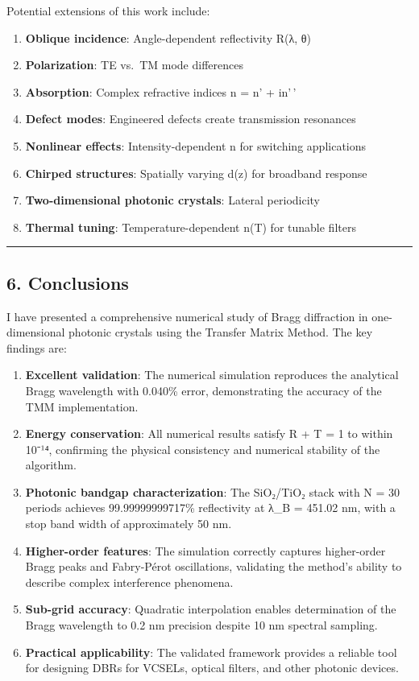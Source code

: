 \documentclass[
]{article}
\providecommand{\tightlist}{%
  \setlength{\itemsep}{0pt}\setlength{\parskip}{0pt}}
\begin{document}
Potential extensions of this work include:

\begin{enumerate}
\def\labelenumi{\arabic{enumi}.}
\tightlist
\item
  \textbf{Oblique incidence}: Angle-dependent reflectivity R(λ, θ)
\item
  \textbf{Polarization}: TE vs.~TM mode differences
\item
  \textbf{Absorption}: Complex refractive indices n = n' + in'\,'
\item
  \textbf{Defect modes}: Engineered defects create transmission
  resonances
\item
  \textbf{Nonlinear effects}: Intensity-dependent n for switching
  applications
\item
  \textbf{Chirped structures}: Spatially varying d(z) for broadband
  response
\item
  \textbf{Two-dimensional photonic crystals}: Lateral periodicity
\item
  \textbf{Thermal tuning}: Temperature-dependent n(T) for tunable
  filters
\end{enumerate}

\begin{center}\rule{0.5\linewidth}{0.5pt}\end{center}

\subsection{6. Conclusions}\label{conclusions}

I have presented a comprehensive numerical study of Bragg diffraction in
one-dimensional photonic crystals using the Transfer Matrix Method. The
key findings are:

\begin{enumerate}
\def\labelenumi{\arabic{enumi}.}
\item
  \textbf{Excellent validation}: The numerical simulation reproduces the
  analytical Bragg wavelength with 0.040\% error, demonstrating the
  accuracy of the TMM implementation.
\item
  \textbf{Energy conservation}: All numerical results satisfy R + T = 1
  to within 10⁻¹⁴, confirming the physical consistency and numerical
  stability of the algorithm.
\item
  \textbf{Photonic bandgap characterization}: The SiO₂/TiO₂ stack with N
  = 30 periods achieves 99.99999999717\% reflectivity at λ\_B = 451.02
  nm, with a stop band width of approximately 50 nm.
\item
  \textbf{Higher-order features}: The simulation correctly captures
  higher-order Bragg peaks and Fabry-Pérot oscillations, validating the
  method's ability to describe complex interference phenomena.
\item
  \textbf{Sub-grid accuracy}: Quadratic interpolation enables
  determination of the Bragg wavelength to 0.2 nm precision despite 10
  nm spectral sampling.
\item
  \textbf{Practical applicability}: The validated framework provides a
  reliable tool for designing DBRs for VCSELs, optical filters, and
  other photonic devices.
\end{enumerate}
\end{document}
